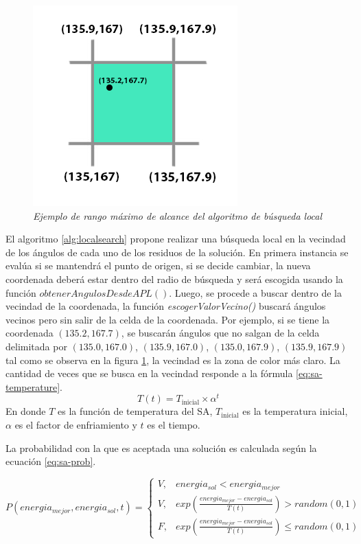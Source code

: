 \begin{figure}[tp]
	\centering
	\includegraphics[scale=.7]{images/ls-range.jpg}
	\caption{\em Ejemplo de rango máximo de alcance del algoritmo de búsqueda local}
	\label{fig:ls-range}
\end{figure}

El algoritmo \ref{alg:localsearch} propone realizar una búsqueda local en la vecindad de los ángulos de cada uno de los residuos de la solución. En primera instancia se evalúa si se mantendrá el punto de origen, si se decide cambiar, la nueva coordenada deberá estar dentro del radio de búsqueda y será escogida usando la función $obtenerAngulosDesdeAPL()$. Luego, se procede a buscar dentro de la vecindad de la coordenada, la función \textit{escogerValorVecino()} buscará ángulos vecinos pero sin salir de la celda de la coordenada. Por ejemplo, si se tiene la coordenada $(135.2,167.7)$, se buscarán ángulos que no salgan de la celda delimitada por $(135.0,167.0)$, $(135.9,167.0)$, $(135.0,167.9)$, $(135.9,167.9)$ tal como se observa en la figura \ref{fig:ls-range}, la vecindad es la zona de color más claro. 
La cantidad de veces que se busca en la vecindad responde a la fórmula \ref{eq:sa-temperature}.
\begin{equation}
    \label{eq:sa-temperature}
    T(t)=T_{\text{inicial}}{\times}\alpha^t
\end{equation}
En donde $T$ es la función de temperatura del SA, $T_{\text{inicial}}$ es la temperatura inicial, $\alpha$ es el factor de enfriamiento y $t$ es el tiempo.

La probabilidad con la que es aceptada una solución es calculada según la ecuación \ref{eq:sa-prob}.

\begin{equation}
    \label{eq:sa-prob}
    P(energia_{mejor},energia_{sol},t) =
    \left\{
        \begin{array}{ll}
            V, & energia_{sol} < energia_{mejor} \\
            V, & exp(\frac{ energia_{mejor}-energia_{sol}}{T(t)}) > random(0,1) \\
            F, & exp(\frac{ energia_{mejor}-energia_{sol}}{T(t)}) \leq random(0,1)
            
        \end{array}
    \right.
\end{equation}
\\[25pt]

